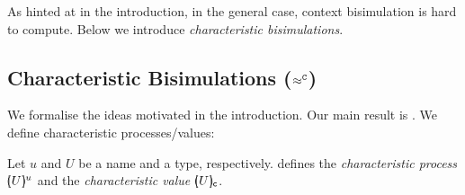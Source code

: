 \noi As hinted at in %
the introduction,
in the general case,
context bisimulation 
is hard to compute. Below we introduce 
\emph{characteristic bisimulations}.

\subsection{%
Characteristic  Bisimulations ($\approx^\mathtt{C}$)}\label{ss:hwb}
\noi 
We formalise the ideas motivated in %
the introduction.
Our main result is .
We define characteristic processes/values:

\begin{definition}\rm
\label{def:char}
	Let $u$ and $U$ be a name and a type, respectively.
	 defines the {\em characteristic process} 
	$[\!\!(U)\!\!]^{u}$ and the {\em characteristic value} $[\!\!(U)\!\!]_{\mathsf{c}}$.
\end{definition}

\smallskip

